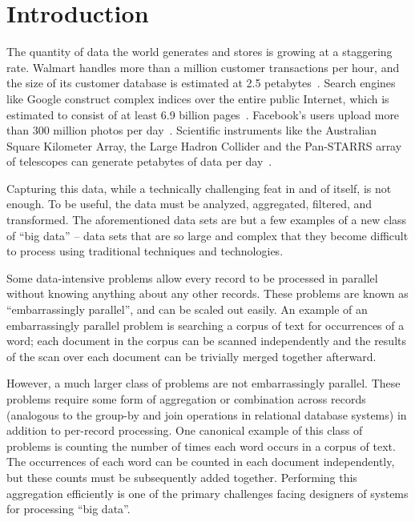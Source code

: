 \chapter{Introduction}
\label{chapter:introduction}

The quantity of data the world generates and stores is growing at a staggering
rate. Walmart handles more than a million customer transactions per hour,
and the size of its customer database is estimated at 2.5
petabytes~\cite{economist-data-data-everywhere}. Search engines like Google
construct complex indices over the entire public Internet, which is estimated
to consist of at least 6.9 billion pages~\cite{worldwidewebsize}. Facebook's
users upload more than 300 million photos per
day~\cite{jay-parikh-slideshow}. Scientific instruments like the Australian
Square Kilometer Array, the Large Hadron Collider and the Pan-STARRS array of
telescopes can generate petabytes of data per day~\cite{fourth-paradigm}.

Capturing this data, while a technically challenging feat in and of itself, is
not enough. To be useful, the data must be analyzed, aggregated, filtered, and
transformed. The aforementioned data sets are but a few examples of a new class
of ``big data'' -- data sets that are so large and complex that they become
difficult to process using traditional techniques and technologies.

Some data-intensive problems allow every record to be processed in parallel
without knowing anything about any other records. These problems are known as
``embarrassingly parallel'', and can be scaled out easily.  An example of an
embarrassingly parallel problem is searching a corpus of text for occurrences
of a word; each document in the corpus can be scanned independently and the
results of the scan over each document can be trivially merged together
afterward.

However, a much larger class of problems are not embarrassingly parallel. These
problems require some form of aggregation or combination across records
(analogous to the group-by and join operations in relational database systems)
in addition to per-record processing. One canonical example of this class of
problems is counting the number of times each word occurs in a corpus of
text. The occurrences of each word can be counted in each document
independently, but these counts must be subsequently added together. Performing
this aggregation efficiently is one of the primary challenges facing designers
of systems for processing ``big data''.

